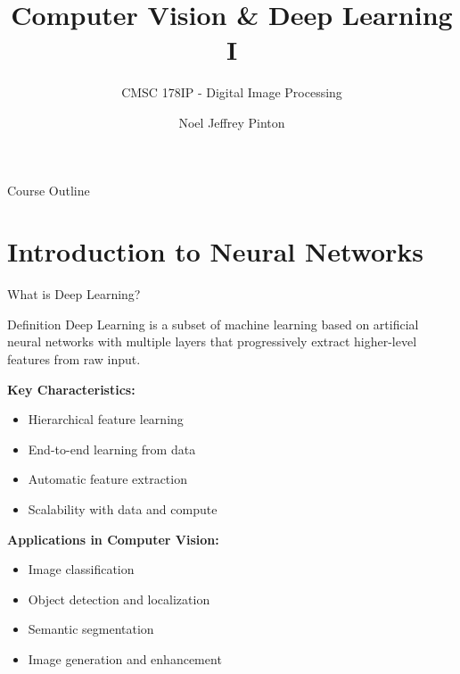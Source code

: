 \documentclass[aspectratio=169,10pt]{beamer}
\title{Computer Vision \& Deep Learning I}
\subtitle{CMSC 178IP - Digital Image Processing}
\author{Noel Jeffrey Pinton}
\institute{University of the Philippines - Cebu\\Department of Computer Science}
\date{}
\begin{document}
\begin{frame}
\titlepage
\end{frame}

\begin{frame}[shrink=10]{Course Outline}
\tableofcontents
\end{frame}

\section{Introduction to Neural Networks}

\begin{frame}{What is Deep Learning?}
\begin{alertblock}{Definition}
Deep Learning is a subset of machine learning based on artificial neural networks with multiple layers that progressively extract higher-level features from raw input.
\end{alertblock}

\textbf{Key Characteristics:}
\begin{itemize}
\item Hierarchical feature learning
\item End-to-end learning from data
\item Automatic feature extraction
\item Scalability with data and compute
\end{itemize}

\textbf{Applications in Computer Vision:}
\begin{itemize}
\item Image classification
\item Object detection and localization
\item Semantic segmentation
\item Image generation and enhancement
\end{itemize}
\end{frame}
\end{document}
